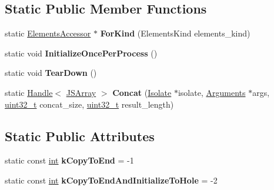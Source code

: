 \subsection*{Static Public Member Functions}
\begin{DoxyCompactItemize}
\item 
\mbox{\label{classv8_1_1internal_1_1ElementsAccessor_af880d16ed39d123746b68f9510956872}} 
static \mbox{\hyperlink{classv8_1_1internal_1_1ElementsAccessor}{Elements\+Accessor}} $\ast$ {\bfseries For\+Kind} (Elements\+Kind elements\+\_\+kind)
\item 
\mbox{\label{classv8_1_1internal_1_1ElementsAccessor_a7d9e3760dd5aad13d53c3ad1e15a8cad}} 
static void {\bfseries Initialize\+Once\+Per\+Process} ()
\item 
\mbox{\label{classv8_1_1internal_1_1ElementsAccessor_acf8472f5ad7353960fa3564b575231c2}} 
static void {\bfseries Tear\+Down} ()
\item 
\mbox{\label{classv8_1_1internal_1_1ElementsAccessor_af02daa2aa04f6ce45ef78f931394d438}} 
static \mbox{\hyperlink{classv8_1_1internal_1_1Handle}{Handle}}$<$ \mbox{\hyperlink{classv8_1_1internal_1_1JSArray}{J\+S\+Array}} $>$ {\bfseries Concat} (\mbox{\hyperlink{classv8_1_1internal_1_1Isolate}{Isolate}} $\ast$isolate, \mbox{\hyperlink{classv8_1_1internal_1_1Arguments}{Arguments}} $\ast$args, \mbox{\hyperlink{classuint32__t}{uint32\+\_\+t}} concat\+\_\+size, \mbox{\hyperlink{classuint32__t}{uint32\+\_\+t}} result\+\_\+length)
\end{DoxyCompactItemize}
\subsection*{Static Public Attributes}
\begin{DoxyCompactItemize}
\item 
\mbox{\label{classv8_1_1internal_1_1ElementsAccessor_a8f8b80e6b69040c509a1ce7774ee48b1}} 
static const \mbox{\hyperlink{classint}{int}} {\bfseries k\+Copy\+To\+End} = -\/1
\item 
\mbox{\label{classv8_1_1internal_1_1ElementsAccessor_a323719573cd6be900ebf66af3244cc97}} 
static const \mbox{\hyperlink{classint}{int}} {\bfseries k\+Copy\+To\+End\+And\+Initialize\+To\+Hole} = -\/2
\end{DoxyCompactItemize}
